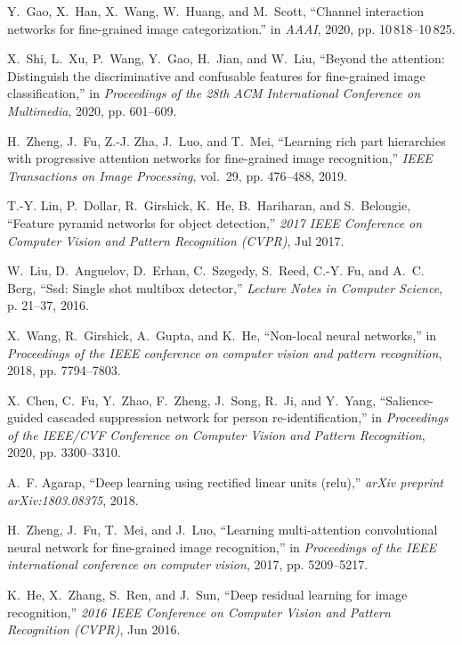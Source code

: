 \documentclass[conference]{IEEEtran}
\begin{document}
\begin{thebibliography}{10}
Y.~Gao, X.~Han, X.~Wang, W.~Huang, and M.~Scott, ``Channel interaction networks
  for fine-grained image categorization.'' in \emph{AAAI}, 2020, pp.
  10\,818--10\,825.

X.~Shi, L.~Xu, P.~Wang, Y.~Gao, H.~Jian, and W.~Liu, ``Beyond the attention:
  Distinguish the discriminative and confusable features for fine-grained image
  classification,'' in \emph{Proceedings of the 28th ACM International
  Conference on Multimedia}, 2020, pp. 601--609.

H.~Zheng, J.~Fu, Z.-J. Zha, J.~Luo, and T.~Mei, ``Learning rich part
  hierarchies with progressive attention networks for fine-grained image
  recognition,'' \emph{IEEE Transactions on Image Processing}, vol.~29, pp.
  476--488, 2019.

T.-Y. Lin, P.~Dollar, R.~Girshick, K.~He, B.~Hariharan, and S.~Belongie,
  ``Feature pyramid networks for object detection,'' \emph{2017 IEEE Conference
  on Computer Vision and Pattern Recognition (CVPR)}, Jul 2017.

W.~Liu, D.~Anguelov, D.~Erhan, C.~Szegedy, S.~Reed, C.-Y. Fu, and A.~C. Berg,
  ``Ssd: Single shot multibox detector,'' \emph{Lecture Notes in Computer
  Science}, p. 21–37, 2016.

X.~Wang, R.~Girshick, A.~Gupta, and K.~He, ``Non-local neural networks,'' in
  \emph{Proceedings of the IEEE conference on computer vision and pattern
  recognition}, 2018, pp. 7794--7803.

X.~Chen, C.~Fu, Y.~Zhao, F.~Zheng, J.~Song, R.~Ji, and Y.~Yang,
  ``Salience-guided cascaded suppression network for person
  re-identification,'' in \emph{Proceedings of the IEEE/CVF Conference on
  Computer Vision and Pattern Recognition}, 2020, pp. 3300--3310.

A.~F. Agarap, ``Deep learning using rectified linear units (relu),''
  \emph{arXiv preprint arXiv:1803.08375}, 2018.

H.~Zheng, J.~Fu, T.~Mei, and J.~Luo, ``Learning multi-attention convolutional
  neural network for fine-grained image recognition,'' in \emph{Proceedings of
  the IEEE international conference on computer vision}, 2017, pp. 5209--5217.

K.~He, X.~Zhang, S.~Ren, and J.~Sun, ``Deep residual learning for image
  recognition,'' \emph{2016 IEEE Conference on Computer Vision and Pattern
  Recognition (CVPR)}, Jun 2016.


\end{thebibliography}
\end{document}

